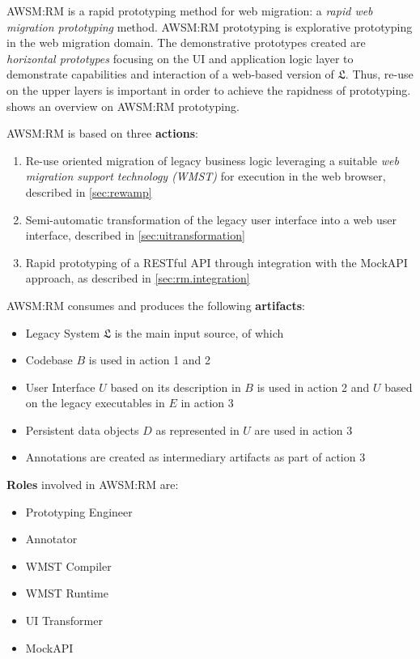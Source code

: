 AWSM:RM is a rapid prototyping method for web migration: a \emph{rapid web migration prototyping} \autocite{Heil2018ReWaMP} method.
AWSM:RM prototyping is explorative prototyping \autocite{Wallmueller2001SoftwareQuality} in the web migration domain.
The demonstrative prototypes created are \emph{horizontal prototypes} \autocite{Wallmueller2001SoftwareQuality} focusing on the UI and application logic layer to demonstrate capabilities and interaction of a web-based version of \(\mathfrak{L}\).
Thus, re-use on the upper layers is important in order to achieve the rapidness of prototyping.
 shows an overview on AWSM:RM prototyping.

AWSM:RM is based on three \textbf{actions}:

\begin{enumerate}
\def\labelenumi{\arabic{enumi}.}
\tightlist
\item
  Re-use oriented migration of legacy business logic leveraging a suitable \emph{web migration support technology (WMST)} for execution in the web browser, described in \cref{sec:rewamp}
\item
  Semi-automatic transformation of the legacy user interface into a web user interface, described in \cref{sec:uitransformation}
\item
  Rapid prototyping of a RESTful API through integration with the MockAPI approach, as described in \cref{sec:rm.integration}
\end{enumerate}

AWSM:RM consumes and produces the following \textbf{artifacts}:

\begin{itemize}
\tightlist
\item
  Legacy System \(\mathfrak{L}\) is the main input source, of which
\item
  Codebase \(B\) is used in action 1 and 2
\item
  User Interface \(U\) based on its description in \(B\) is used in action 2 and \(U\) based on the legacy executables in \(E\) in action 3
\item
  Persistent data objects \(D\) as represented in \(U\) are used in action 3
\item
  Annotations are created as intermediary artifacts as part of action 3
\end{itemize}

\textbf{Roles} involved in AWSM:RM are:

\begin{itemize}
\tightlist
\item
  Prototyping Engineer
\item
  Annotator
\item
  WMST Compiler
\item
  WMST Runtime
\item
  UI Transformer
\item
  MockAPI
\end{itemize}

